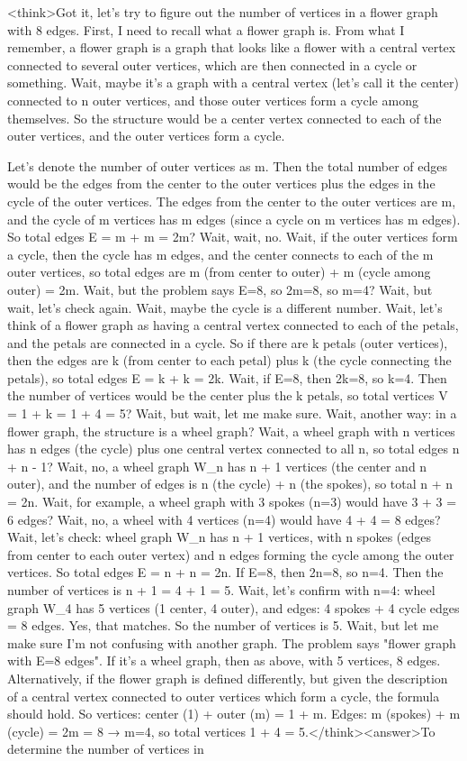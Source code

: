 <think>Got it, let's try to figure out the number of vertices in a flower graph with 8 edges. First, I need to recall what a flower graph is. From what I remember, a flower graph is a graph that looks like a flower with a central vertex connected to several outer vertices, which are then connected in a cycle or something. Wait, maybe it's a graph with a central vertex (let's call it the center) connected to n outer vertices, and those outer vertices form a cycle among themselves. So the structure would be a center vertex connected to each of the outer vertices, and the outer vertices form a cycle. 

Let's denote the number of outer vertices as m. Then the total number of edges would be the edges from the center to the outer vertices plus the edges in the cycle of the outer vertices. The edges from the center to the outer vertices are m, and the cycle of m vertices has m edges (since a cycle on m vertices has m edges). So total edges E = m + m = 2m? Wait, wait, no. Wait, if the outer vertices form a cycle, then the cycle has m edges, and the center connects to each of the m outer vertices, so total edges are m (from center to outer) + m (cycle among outer) = 2m. Wait, but the problem says E=8, so 2m=8, so m=4? Wait, but wait, let's check again. Wait, maybe the cycle is a different number. Wait, let's think of a flower graph as having a central vertex connected to each of the petals, and the petals are connected in a cycle. So if there are k petals (outer vertices), then the edges are k (from center to each petal) plus k (the cycle connecting the petals), so total edges E = k + k = 2k. Wait, if E=8, then 2k=8, so k=4. Then the number of vertices would be the center plus the k petals, so total vertices V = 1 + k = 1 + 4 = 5? Wait, but wait, let me make sure. Wait, another way: in a flower graph, the structure is a wheel graph? Wait, a wheel graph with n vertices has n edges (the cycle) plus one central vertex connected to all n, so total edges n + n - 1? Wait, no, a wheel graph W_n has n + 1 vertices (the center and n outer), and the number of edges is n (the cycle) + n (the spokes), so total n + n = 2n. Wait, for example, a wheel graph with 3 spokes (n=3) would have 3 + 3 = 6 edges? Wait, no, a wheel with 4 vertices (n=4) would have 4 + 4 = 8 edges? Wait, let's check: wheel graph W_n has n + 1 vertices, with n spokes (edges from center to each outer vertex) and n edges forming the cycle among the outer vertices. So total edges E = n + n = 2n. If E=8, then 2n=8, so n=4. Then the number of vertices is n + 1 = 4 + 1 = 5. Wait, let's confirm with n=4: wheel graph W_4 has 5 vertices (1 center, 4 outer), and edges: 4 spokes + 4 cycle edges = 8 edges. Yes, that matches. So the number of vertices is 5. Wait, but let me make sure I'm not confusing with another graph. The problem says "flower graph with E=8 edges". If it's a wheel graph, then as above, with 5 vertices, 8 edges. Alternatively, if the flower graph is defined differently, but given the description of a central vertex connected to outer vertices which form a cycle, the formula should hold. So vertices: center (1) + outer (m) = 1 + m. Edges: m (spokes) + m (cycle) = 2m = 8 → m=4, so total vertices 1 + 4 = 5.</think><answer>To determine the number of vertices in 